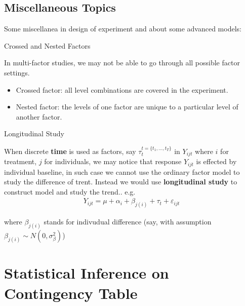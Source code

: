     

\subsection{Miscellaneous Topics}
Some miscellanea in design of experiment and about some advanced models:

\begin{point}
    Crossed and Nested Factors
\end{point}

In multi-factor studies, we may not be able to go through all possible factor settings.

\begin{itemize}[topsep=2pt,itemsep=0pt]
    \item Crossed factor: all level combinations are covered in the experiment.
    \item Nested factor: the levels of one factor are unique to a particular level of another factor.

    
\end{itemize}

    

\begin{point}
    Longitudinal Study
\end{point}

    When discrete \textbf{time} is used as factors, say $ \tau_t^{t=\{t_1,\ldots,t_T\}} $ in $ Y_{ijt} $ where $ i $ for treatment, $ j $ for individuals, we may notice that response $ Y_{ijt} $ is effected by individual baseline, in such case we cannot use the ordinary factor model to study the difference of trent. Instead we would use \textbf{longitudinal study} to construct model and study the trend.. e.g.
    \begin{align}
        Y_{ijt}=\mu +\alpha _i+\beta _{j(i)}+\tau_t+\varepsilon _{ijt} 
    \end{align}
    
    where $ \beta _{j(i)} $ stands for indivudual difference (say, with assumption $ \beta _{j(i)}\sim N(0,\sigma ^2_\beta ) $)


    



\section{Statistical Inference on Contingency Table}


